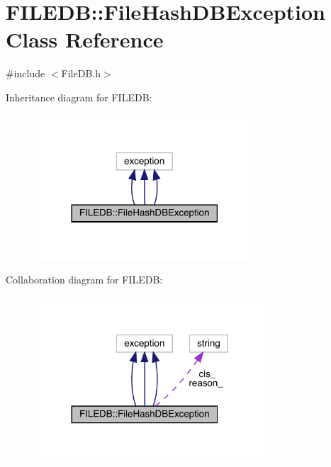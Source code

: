 \hypertarget{classFILEDB_1_1FileHashDBException}{}\section{F\+I\+L\+E\+DB\+:\+:File\+Hash\+D\+B\+Exception Class Reference}
\label{classFILEDB_1_1FileHashDBException}


{\ttfamily \#include $<$File\+D\+B.\+h$>$}



Inheritance diagram for F\+I\+L\+E\+DB\+:
\nopagebreak
\begin{figure}[H]
\begin{center}
\leavevmode
\includegraphics[width=234pt]{d9/df8/classFILEDB_1_1FileHashDBException__inherit__graph}
\end{center}
\end{figure}


Collaboration diagram for F\+I\+L\+E\+DB\+:
\nopagebreak
\begin{figure}[H]
\begin{center}
\leavevmode
\includegraphics[width=245pt]{d8/da2/classFILEDB_1_1FileHashDBException__coll__graph}
\end{center}
\end{figure}
